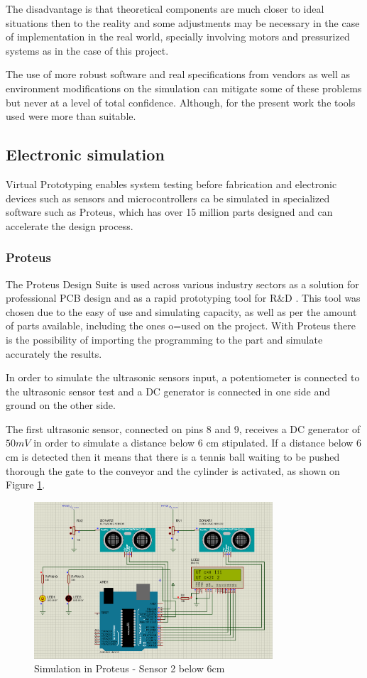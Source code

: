 \documentclass[transmag]{IEEEtran}
\begin{document}
The disadvantage is that theoretical components are much closer to ideal situations then to the reality and some adjustments may be necessary in the case of implementation in the real world, specially involving motors and pressurized systems as in the case of this project. 

The use of more robust software and real specifications from vendors as well as environment modifications on the simulation can mitigate some of these problems but never at a level of total confidence. Although, for the present work the tools used were more than suitable.


\subsection{Electronic simulation}


Virtual Prototyping enables system testing before fabrication and electronic devices such as sensors and microcontrollers ca be simulated in specialized software such as Proteus, which has over 15 million parts designed and can accelerate the design process.

\subsubsection{Proteus}

The Proteus Design Suite is used across various industry sectors as a solution for professional PCB design and as a rapid prototyping tool for R$\&$D \cite{ref3}. This tool was chosen due to the easy of use and simulating capacity, as well as per the amount of parts available, including the ones o=used on the project.
With Proteus there is the possibility of importing the programming to the part and simulate accurately the results.

In order to simulate the ultrasonic sensors input, a potentiometer is connected to the ultrasonic sensor test and a DC generator is connected in one side and ground on the other side. 

The first ultrasonic sensor, connected on pins 8 and 9, receives a DC generator of $50 mV$ in order to simulate a distance below 6 cm stipulated. If a distance below 6 cm is detected then it means that there is a tennis ball waiting to be pushed thorough the gate to the conveyor and the cylinder is activated, as shown on Figure \ref{Proteus1}. 

\begin{figure}[h]
\centerline{\includegraphics[width=3.5in]{./images/Proteus1}}
\caption{Simulation in Proteus - Sensor 2 below 6cm\label{Proteus1}}
\end{figure}
\end{document}
